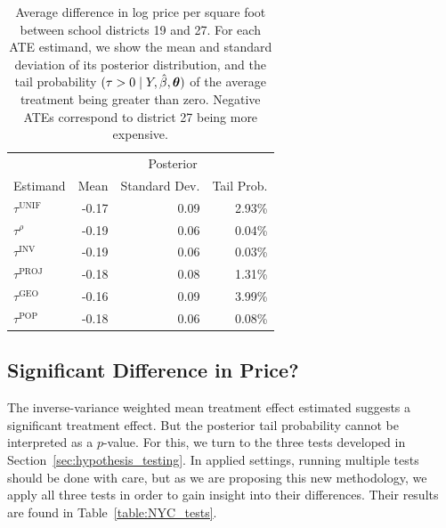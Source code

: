 \documentclass[letter,12pt]{article}
\let\Pr\relax
\DeclareMathOperator{\Pr}{\mathbb{P}}
\newcommand{\unifavg}{\tau^{\mathrm{UNIF}}}
\newcommand{\invvar}{\tau^{\mathrm{INV}}}
\newcommand{\taurho}{\tau^{\rho}}
\newcommand{\tauproj}{\tau^{\mathrm{PROJ}}}
\newcommand{\taugeo}{\tau^{\mathrm{GEO}}}
\newcommand{\taupop}{\tau^{\mathrm{POP}}}
\newcommand{\hyperparam}{\bm{\theta}}
\begin{document}
\begin{table}
    \centering
    \begin{tabular}{lrrr}
        \hline
        & \multicolumn{3}{c}{Posterior} \\
        Estimand & Mean & Standard Dev. & Tail Prob. \\
        \hline
        $\unifavg$ & -0.17 & 0.09 & 2.93\% \\
        $\taurho$  & -0.19 & 0.06 & 0.04\% \\
        $\invvar$  & -0.19 & 0.06 & 0.03\% \\
        $\tauproj$ & -0.18 & 0.08 & 1.31\% \\
        $\taugeo$  & -0.16 & 0.09 & 3.99\% \\
        $\taupop$  & -0.18 & 0.06 & 0.08\% \\
        \hline
    \end{tabular}
    \label{table:NYC_ate}
    \caption{Average difference in log price per square foot between school districts 19 and 27. For each ATE estimand, we show the mean and standard deviation of its posterior distribution, and the tail probability $\Pr(\tau > 0 \mid Y, \hat{\beta}, \hyperparam)$ of the average treatment being greater than zero. Negative ATEs correspond to district 27 being more expensive.}
\end{table}
\hypertarget{significant-difference-in-price}{%
\subsection{Significant Difference in Price?}\label{significant-difference-in-price}}

The inverse-variance weighted mean treatment effect estimated suggests a significant treatment effect.
But the posterior tail probability cannot be interpreted as a \(p\)-value.
For this, we turn to the three tests developed in Section~\ref{sec:hypothesis_testing}.
In applied settings, running multiple tests should be done with care,
but as we are proposing this new methodology,
we apply all three tests in order to gain insight into their differences.
Their results are found in Table~\ref{table:NYC_tests}.
\end{document}
